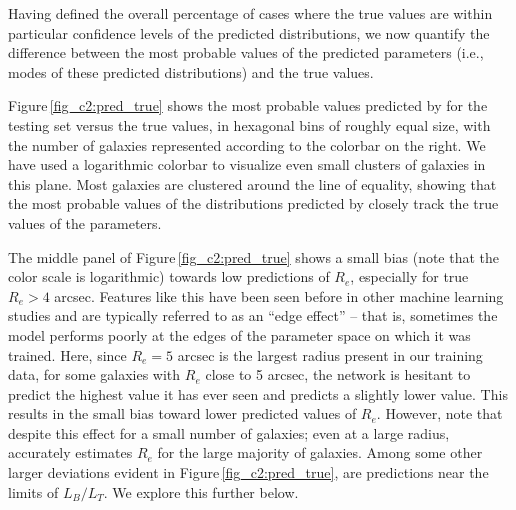 
Having defined the overall percentage of cases where the true values are within particular confidence levels of the predicted distributions, we now quantify the difference between the most probable values of the predicted parameters (i.e., modes of these predicted distributions) and the true values. 

Figure\,\ref{fig_c2:pred_true} shows the most probable values predicted by \gampen{} for the testing set versus the true values, %
in hexagonal bins of roughly equal size, with the number of galaxies represented according to the colorbar on the right. %
We have used a logarithmic colorbar to visualize even small clusters of galaxies in this plane. 
Most galaxies are clustered around the line of equality, showing that the most probable values of the distributions predicted by \gampen{} closely track the true values of the parameters. 

The middle panel of Figure\,\ref{fig_c2:pred_true} shows a small bias (note that the color scale is logarithmic) towards low predictions of $R_e$, especially for true $R_e > 4$ arcsec. Features like this have been seen before in other machine learning studies and are typically referred to as an “edge effect” -- that is, sometimes the model performs poorly at the edges of the parameter space on which it was trained. Here, since $R_e=5$ arcsec is the largest radius present in our training data, for some galaxies with $R_e$ close to 5 arcsec, the network is hesitant to predict the highest value it has ever seen and predicts a slightly lower value. This results in the small bias toward lower predicted values of $R_e$. However, note that despite this effect for a small number of galaxies; even at a  large radius, \gampen{} accurately estimates $R_e$ for the large majority of galaxies. Among some other larger deviations evident in Figure\,\ref{fig_c2:pred_true}, are predictions near the limits of $L_B/L_T$. We explore this further below. 

